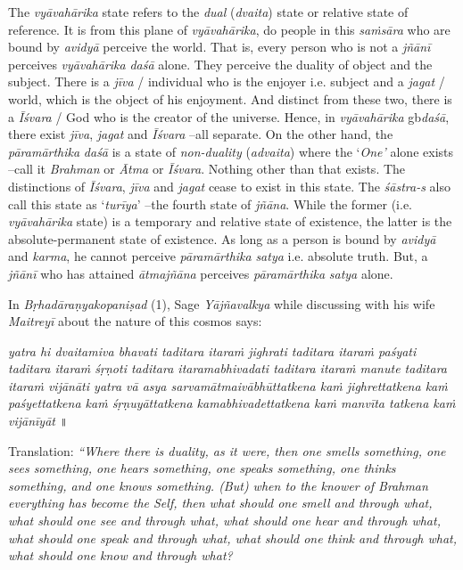 The \emph{vyāvahārika} state refers to the \emph{dual} (\emph{dvaita}) state or relative state of reference. It is from this plane of \emph{vyāvahārika}, do people in this \emph{saṁsāra} who are bound by \emph{avidyā} perceive the world. That is, every person who is not a \emph{jñānī} perceives \emph{vyāvahārika} \emph{daśā} alone. They perceive the duality of object and the subject. There is a \emph{jīva} / individual who is the enjoyer i.e. subject and a \emph{jagat} / world, which is the object of his enjoyment. And distinct from these two, there is a \emph{Īśvara} / God who is the creator of the universe. Hence, in \emph{vyāvahārika} gb\emph{daśā}, there exist \emph{jīva}, \emph{jagat} and \emph{Īśvara} --all separate. On the other hand, the \emph{pāramārthika} \emph{daśā} is a state of \emph{non-duality} (\emph{advaita}) where the `\emph{One'} alone exists --call it \emph{Brahman} or \emph{Ātma} or \emph{Īśvara}. Nothing other than that exists. The distinctions of \emph{Īśvara}, \emph{jīva} and \emph{jagat} cease to exist in this state. The \emph{śāstra-s} also call this state as `\emph{turīya}' --the fourth state of \emph{jñāna}. While the former (i.e. \emph{vyāvahārika} state) is a temporary and relative state of existence, the latter is the absolute-permanent state of existence. As long as a person is bound by \emph{avidyā} and \emph{karma}, he cannot perceive \emph{pāramārthika} \emph{satya} i.e. absolute truth. But, a \emph{jñānī} who has attained \emph{ātmajñāna} perceives \emph{pāramārthika} \emph{satya} alone.

In \emph{Bṛhadāraṇyakopaniṣad} (1), Sage \emph{Yājñavalkya} while discussing with his wife \emph{Maitreyī} about the nature of this cosmos says:

\emph{yatra hi dvaitamiva bhavati taditara itaraṁ jighrati taditara itaraṁ paśyati taditara itaraṁ śṛṇoti taditara itaramabhivadati taditara itaraṁ manute taditara itaraṁ vijānāti yatra vā asya sarvamātmaivābhūttatkena kaṁ jighrettatkena kaṁ paśyettatkena kaṁ śṛṇuyāttatkena kamabhivadettatkena kaṁ manvīta tatkena kaṁ vijānīyāt} ॥

Translation: \emph{``Where there is duality, as it were, then one smells something, one sees something, one hears something, one speaks something, one thinks something, and one knows something. (But) when to the knower of Brahman everything has become the Self, then what should one smell and through what, what should one see and through what, what should one hear and through what, what should one speak and through what, what should one think and through what, what should one know and through what?}

